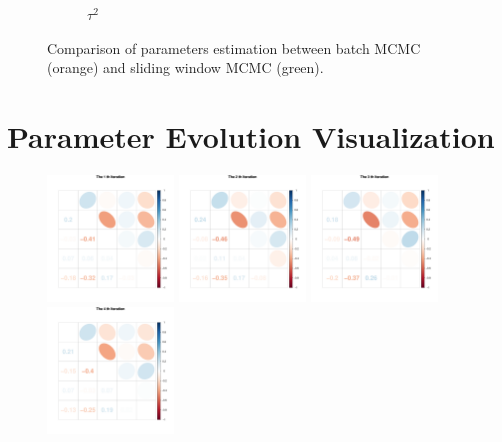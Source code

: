 \begin{figure}[h]
\begin{subfigure}[b]{0.45\textwidth}
\caption{$\tau^2$}
\end{subfigure}
\caption{Comparison of parameters estimation between batch MCMC (orange) and sliding window MCMC (green). }\label{batchwindowparameter}
\end{figure}



\clearpage

\section{Parameter Evolution Visualization}

\begin{figure}[h]
\centering
\includegraphics[width=0.3\textwidth,height=0.18\textheight]{Chapters/05MCMCOU/plots/paraEvolution/corMatrix1.pdf}
\includegraphics[width=0.3\textwidth,height=0.18\textheight]{Chapters/05MCMCOU/plots/paraEvolution/corMatrix2.pdf}
\includegraphics[width=0.3\textwidth,height=0.18\textheight]{Chapters/05MCMCOU/plots/paraEvolution/corMatrix3.pdf}
\includegraphics[width=0.3\textwidth,height=0.18\textheight]{Chapters/05MCMCOU/plots/paraEvolution/corMatrix4.pdf}

\end{figure}
